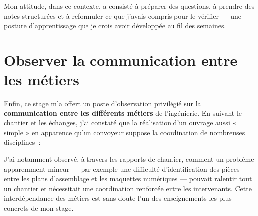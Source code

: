\documentclass[12pt,a4paper,oneside]{report}
\begin{document}
Mon attitude, dans ce contexte, a consisté à préparer des questions, à prendre des notes structurées et à reformuler ce que j'avais compris pour le vérifier --- une posture d'apprentissage que je crois avoir développée au fil des semaines.

\section{Observer la communication entre les métiers}

Enfin, ce stage m'a offert un poste d'observation privilégié sur la \textbf{communication entre les différents métiers} de l'ingénierie. En suivant le chantier et les échanges, j'ai constaté que la réalisation d'un ouvrage aussi « simple » en apparence qu'un convoyeur suppose la coordination de nombreuses disciplines~:

\begin{center}
\label{fig:coordination}
\end{center}

J'ai notamment observé, à travers les rapports de chantier, comment un problème apparemment mineur --- par exemple une difficulté d'identification des pièces entre les plans d'assemblage et les maquettes numériques --- pouvait ralentir tout un chantier et nécessitait une coordination renforcée entre les intervenants. Cette interdépendance des métiers est sans doute l'un des enseignements les plus concrets de mon stage.
\end{document}
